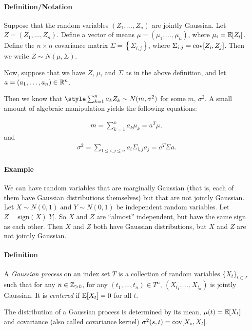 \documentclass[../../../Master/AppliedStochastics.tex]{subfiles}
\begin{document}
\paragraph{Definition/Notation} Suppose that the random variables $(Z_1,\dots,Z_n)$ are jointly Gaussian.  
Let $Z=(Z_1,\dots,Z_n)$.  
Define a vector of means $\mu=(\mu_1, \ldots, \mu_n)$,
where $\mu_i = \mathbb{E}[Z_i]$.
Define the $n\times n$ covariance matrix 
$\Sigma=\left\{\Sigma_{i,j}\right\}$, where $\Sigma_{i,j}=\operatorname{cov}[Z_i,Z_j]$.  
Then we write $Z\sim N(\mu, \Sigma)$.

Now, suppose that we have $Z$, $\mu$, and $\Sigma$ as in the above definition, and let $a = (a_1,\dots,a_n) \in \mathbb{R}^n$.  

Then we know that $\style\sum_{k=1}^n a_kZ_k\sim N(m,\sigma^2)$ for some $m$, $\sigma^2$.  
A small amount of algebraic manipulation yields the following equations:

$$\begin{aligned}
    m=\sum_{k=1}^n a_k\mu_k=a^T\mu,
\end{aligned}$$
and 
$$\begin{aligned}
    \sigma^2=\sum_{1\leq i,j\leq n} a_i\Sigma_{i,j}a_j=a^T\Sigma a.
\end{aligned}$$


\paragraph{Example} 
We can have random variables that are marginally Gaussian (that is, each of them have Gaussian distributions themselves) but that are not jointly Gaussian.  
Let $X\sim N(0,1)$ and $Y\sim N(0,1)$ be independent random variables.  
Let $Z=\mathrm{sign}(X)|Y|$.  
So $X$ and $Z$ are ``almost'' independent, but have the same sign as each other.  
Then $X$ and $Z$ both have Gaussian distributions, but $X$ and $Z$ are not jointly Gaussian.

\paragraph{Definition} 
A \emph{Gaussian process} on an index set $T$ is a collection of random variables $\{X_t\}_{t\in T}$ 
such that for any $n\in\mathbb{Z}_{>0}$, for any $(t_1,\dots,t_n)\in T^n$, $(X_{t_1},\dots,X_{t_n})$ is jointly Gaussian.  
It is \emph{centered} if $\mathbb{E}[X_t]=0$ for all $t$.

The distribution of a Gaussian process is determined 
by its mean, $\mu(t)=\mathbb{E}[X_t]$ and covariance (also called covariance kernel) $\sigma^2(s,t)=\operatorname{cov}[X_s,X_t]$.
\end{document}
